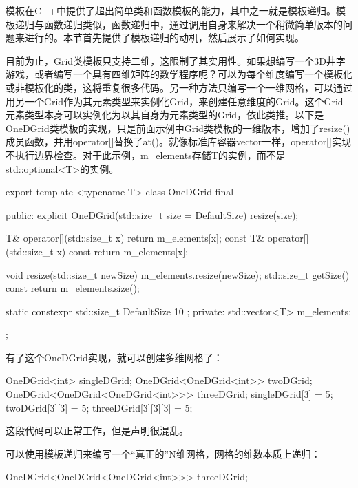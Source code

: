 
模板在C++中提供了超出简单类和函数模板的能力，其中之一就是模板递归。模板递归与函数递归类似，函数递归中，通过调用自身来解决一个稍微简单版本的问题来进行的。本节首先提供了模板递归的动机，然后展示了如何实现。


目前为止，Grid类模板只支持二维，这限制了其实用性。如果想编写一个3D井字游戏，或者编写一个具有四维矩阵的数学程序呢？可以为每个维度编写一个模板化或非模板化的类，这将重复很多代码。另一种方法只编写一个一维网格，可以通过用另一个Grid作为其元素类型来实例化Grid，来创建任意维度的Grid。这个Grid元素类型本身可以实例化为以其自身为元素类型的Grid，依此类推。以下是OneDGrid类模板的实现，只是前面示例中Grid类模板的一维版本，增加了resize()成员函数，并用operator[]替换了at()。就像标准库容器vector一样，operator[]实现不执行边界检查。对于此示例，m\_elements存储T的实例，而不是std::optional<T>的实例。

\begin{cpp}
export template <typename T>
class OneDGrid final
{
    public:
        explicit OneDGrid(std::size_t size = DefaultSize) { resize(size); }

        T& operator[](std::size_t x) { return m_elements[x]; }
        const T& operator[](std::size_t x) const { return m_elements[x]; }

        void resize(std::size_t newSize) { m_elements.resize(newSize); }
        std::size_t getSize() const { return m_elements.size(); }

        static constexpr std::size_t DefaultSize { 10 };
    private:
        std::vector<T> m_elements;
};
\end{cpp}

有了这个OneDGrid实现，就可以创建多维网格了：

\begin{cpp}
OneDGrid<int> singleDGrid;
OneDGrid<OneDGrid<int>> twoDGrid;
OneDGrid<OneDGrid<OneDGrid<int>>> threeDGrid;
singleDGrid[3] = 5;
twoDGrid[3][3] = 5;
threeDGrid[3][3][3] = 5;
\end{cpp}

这段代码可以正常工作，但是声明很混乱。


可以使用模板递归来编写一个“真正的”N维网格，网格的维数本质上递归：

\begin{cpp}
OneDGrid<OneDGrid<OneDGrid<int>>> threeDGrid;
\end{cpp}

